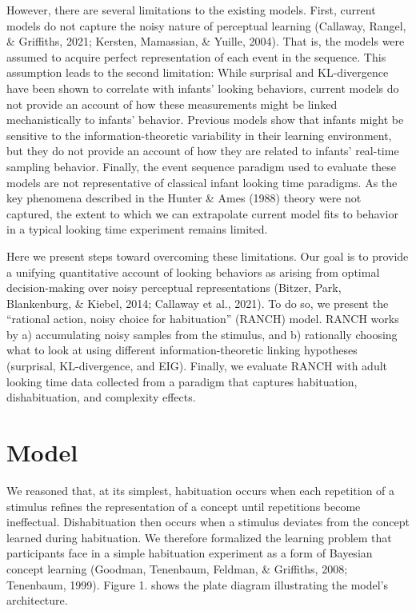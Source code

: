 \documentclass[10pt, letterpaper]{article}
\begin{document}
However, there are several limitations to the existing models. First,
current models do not capture the noisy nature of perceptual learning
(Callaway, Rangel, \& Griffiths, 2021; Kersten, Mamassian, \& Yuille,
2004). That is, the models were assumed to acquire perfect
representation of each event in the sequence. This assumption leads to
the second limitation: While surprisal and KL-divergence have been shown
to correlate with infants' looking behaviors, current models do not
provide an account of how these measurements might be linked
mechanistically to infants' behavior. Previous models show that infants
might be sensitive to the information-theoretic variability in their
learning environment, but they do not provide an account of how they are
related to infants' real-time sampling behavior. Finally, the event
sequence paradigm used to evaluate these models are not representative
of classical infant looking time paradigms. As the key phenomena
described in the Hunter \& Ames (1988) theory were not captured, the
extent to which we can extrapolate current model fits to behavior in a
typical looking time experiment remains limited.

Here we present steps toward overcoming these limitations. Our goal is
to provide a unifying quantitative account of looking behaviors as
arising from optimal decision-making over noisy perceptual
representations (Bitzer, Park, Blankenburg, \& Kiebel, 2014; Callaway et
al., 2021). To do so, we present the ``rational action, noisy choice for
habituation'' (RANCH) model. RANCH works by a) accumulating noisy
samples from the stimulus, and b) rationally choosing what to look at
using different information-theoretic linking hypotheses (surprisal,
KL-divergence, and EIG). Finally, we evaluate RANCH with adult looking
time data collected from a paradigm that captures habituation,
dishabituation, and complexity effects.

\hypertarget{model}{%
\section{Model}\label{model}}

We reasoned that, at its simplest, habituation occurs when each
repetition of a stimulus refines the representation of a concept until
repetitions become ineffectual. Dishabituation then occurs when a
stimulus deviates from the concept learned during habituation. We
therefore formalized the learning problem that participants face in a
simple habituation experiment as a form of Bayesian concept learning
(Goodman, Tenenbaum, Feldman, \& Griffiths, 2008; Tenenbaum, 1999).
Figure 1. shows the plate diagram illustrating the model's architecture.
\end{document}
